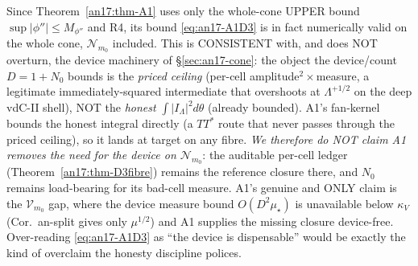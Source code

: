 \begin{remark}\label{an17:rem-A1scope}
Since Theorem~\ref{an17:thm-A1} uses only the whole-cone UPPER bound
$\sup|\phi''|\le M_{\phi''}$ and R4, its bound \eqref{eq:an17-A1D3} is in fact
numerically valid on the whole cone, $\mathcal N_{m_0}$ included. This is
CONSISTENT with, and does NOT overturn, the device machinery of
\S\ref{sec:an17-cone}: the object the device/count $D=1+N_0$ bounds is the
\emph{priced ceiling} (per-cell amplitude$^2\times$measure, a legitimate
immediately-squared intermediate that overshoots at $\Lambda^{+1/2}$ on the deep
vdC-II shell), NOT the \emph{honest} $\int|I_\Lambda|^2 d\theta$ (already bounded).
A1's fan-kernel bounds the honest integral directly (a $TT^*$ route that never
passes through the priced ceiling), so it lands at target on any fibre.
\emph{We therefore do NOT claim A1 removes the need for the device on $\mathcal
N_{m_0}$}: the auditable per-cell ledger (Theorem~\ref{an17:thm-D3fibre}) remains
the reference closure there, and $N_0$ remains load-bearing for its bad-cell
measure. A1's genuine and ONLY claim is the $\mathcal V_{m_0}$ gap, where the
device measure bound $O(D^2\mu_\star)$ is unavailable below $\kappa_V$
(Cor.~an-split gives only $\mu^{1/2}$) and A1 supplies the missing closure
device-free. Over-reading \eqref{eq:an17-A1D3} as ``the device is dispensable''
would be exactly the kind of overclaim the honesty discipline polices.
\end{remark}

